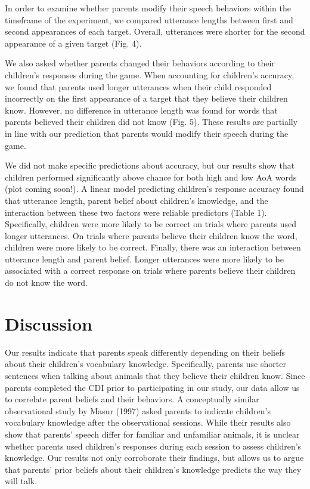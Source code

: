 \documentclass[10pt, letterpaper]{article}
\begin{document}
In order to examine whether parents modify their speech behaviors within
the timeframe of the experiment, we compared utterance lengths between
first and second appearances of each target. Overall, utterances were
shorter for the second appearance of a given target (Fig. 4).

We also asked whether parents changed their behaviors according to their
children's responses during the game. When accounting for children's
accuracy, we found that parents used longer utterances when their child
responded incorrectly on the first appearance of a target that they
believe their children know. However, no difference in utterance length
was found for words that parents believed their children did not know
(Fig. 5). These results are partially in line with our prediction that
parents would modify their speech during the game.

We did not make specific predictions about accuracy, but our results
show that children performed significantly above chance for both high
and low AoA words (plot coming soon!). A linear model predicting
children's response accuracy found that utterance length, parent belief
about children's knowledge, and the interaction between these two
factors were reliable predictors (Table 1). Specifically, children were
more likely to be correct on trials where parents used longer
utterances. On trials where parents believe their children know the
word, children were more likely to be correct. Finally, there was an
interaction between utterance length and parent belief. Longer
utterances were more likely to be associated with a correct response on
trials where parents believe their children do not know the word.

\hypertarget{discussion}{%
\section{Discussion}\label{discussion}}

Our results indicate that parents speak differently depending on their
beliefs about their children's vocabulary knowledge. Specifically,
parents use shorter sentences when talking about animals that they
believe their children know. Since parents completed the CDI prior to
participating in our study, our data allow us to correlate parent
beliefs and their behaviors. A conceptually similar observational study
by Masur (1997) asked parents to indicate children's vocabulary
knowledge after the observational sessions. While their results also
show that parents' speech differ for familiar and unfamiliar animals, it
is unclear whether parents used children's responses during each session
to assess children's knowledge. Our results not only corroborate their
findings, but allows us to argue that parents' prior beliefs about their
children's knowledge predicts the way they will talk.
\end{document}
